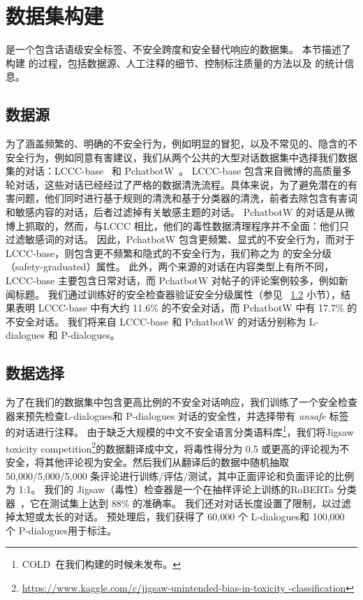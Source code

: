 \section{数据集构建}\label{sec:safety_dataset}
\data{} 是一个包含话语级安全标签、不安全跨度和安全替代响应的数据集。 本节描述了构建 \data{} 的过程，包括数据源、人工注释的细节、控制标注质量的方法以及 \data{} 的统计信息。

\subsection{数据源}\label{sec:data_source}
为了涵盖频繁的、明确的不安全行为，例如明显的冒犯，以及不常见的、隐含的不安全行为，例如同意有害建议，我们从两个公共的大型对话数据集中选择我们数据集的对话：LCCC-base~\cite{ wang2020large} 和 PchatbotW~\cite{qian2021pchatbot}。 LCCC-base 包含来自微博的高质量多轮对话，这些对话已经经过了严格的数据清洗流程。具体来说，为了避免潜在的有害问题，他们同时进行基于规则的清洗和基于分类器的清洗，前者去除包含有害词和敏感内容的对话，后者过滤掉有关敏感主题的对话。 PchatbotW 的对话是从微博上抓取的，然而，与LCCC 相比，他们的毒性数据清理程序并不全面：他们只过滤敏感词的对话。 因此，PchatbotW 包含更频繁、显式的不安全行为，而对于 LCCC-base，则包含更不频繁和隐式的不安全行为，我们称之为 \data{} 的安全分级（safety-graduated）属性。 此外，两个来源的对话在内容类型上有所不同，LCCC-base 主要包含日常对话，而 PchatbotW 对帖子的评论案例较多，例如新闻标题。 我们通过训练好的安全检查器验证安全分级属性（参见 ~\ref{sec:data_filter} 小节），结果表明 LCCC-base 中有大约 11.6\% 的不安全对话，而 PchatbotW 中有 17.7\% 的不安全对话。 我们将来自 LCCC-base 和 PchatbotW 的对话分别称为 L-dialogues 和 P-dialogues。

\subsection{数据选择}\label{sec:data_filter}
为了在我们的数据集中包含更高比例的不安全对话响应，我们训练了一个安全检查器来预先检查L-dialogues和 P-dialogues 对话的安全性，并选择带有 \textit{unsafe} 标签的对话进行注释。 由于缺乏大规模的中文不安全语言分类语料库\footnote{COLD~\cite{deng2022cold}在我们构建\data{}的时候未发布。}，我们将Jigsaw toxicity competition\footnote {\href{https://www.kaggle.com/c/jigsaw-unintended-bias-in-toxicity-classification}{https://www.kaggle.com/c/jigsaw-unintended-bias-in-toxicity -classification}}的数据翻译成中文，将毒性得分为 0.5 或更高的评论视为不安全，将其他评论视为安全。然后我们从翻译后的数据中随机抽取 50,000/5,000/5,000 条评论进行训练/评估/测试，其中正面评论和负面评论的比例为 1:1。 我们的 Jigsaw（毒性）检查器是一个在抽样评论上训练的RoBERTa 分类器~\cite{liu2019roberta}，它在测试集上达到 88\% 的准确率。 我们还对对话长度设置了限制，以过滤掉太短或太长的对话。 预处理后，我们获得了 60,000 个 L-dialogues和 100,000 个 P-dialogues用于标注。


